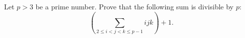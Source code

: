 \problem{}
Let $p > 3$ be a prime number.
Prove that the following sum is divisible by  $p$:
\[
    \left(
        \sum_{2 \leq i < j < k \leq p-1}
            i j k
    \right)
    + 1
.\]
\solution
\endproblem
